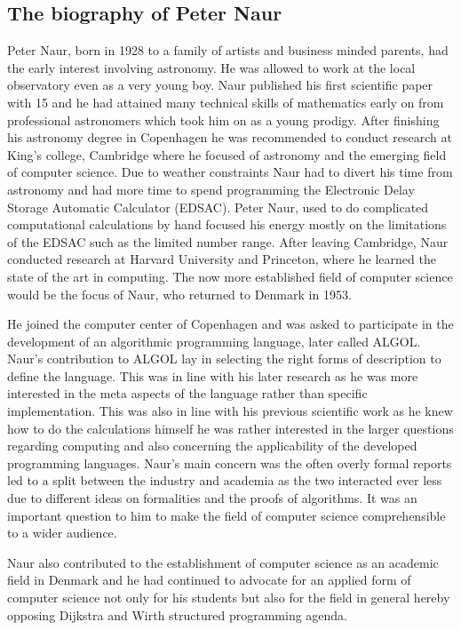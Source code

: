 \documentclass{article}
\begin{document}
\subsection{The biography of Peter Naur}
Peter Naur, born in 1928 to a family of artists and business minded parents, had the early interest involving astronomy. He was allowed to work at the local observatory even as a very young boy. Naur published his first scientific paper with 15 and he had attained many technical skills of mathematics early on from professional astronomers which took him on as a young prodigy. After finishing his astronomy degree in Copenhagen he was recommended to conduct research at King's college, Cambridge where he focused of astronomy and the emerging field of computer science. Due to weather constraints Naur had to divert his time from astronomy and had more time to spend programming the Electronic Delay Storage Automatic Calculator (EDSAC). Peter Naur, used to do complicated computational calculations by hand focused his energy mostly on the limitations of the EDSAC such as the limited number range. After leaving Cambridge, Naur conducted research at Harvard University and Princeton, where he learned the state of the art in computing. The now more established field of computer science would be the focus of Naur, who returned to Denmark in 1953.

He joined the computer center of Copenhagen and was asked to participate in the development of an algorithmic programming language, later called ALGOL. Naur's contribution to ALGOL lay in selecting the right forms of description to define the language. This was in line with his later research as he was more interested in the meta aspects of the language rather than specific implementation. This was also in line with his previous scientific work as he knew how to do the calculations himself he was rather interested in the larger questions regarding computing and also concerning the applicability of the  developed programming languages. Naur's main concern was the often overly formal reports led to a split between the industry and academia as the two interacted ever less due to different ideas on formalities and the proofs of algorithms. It was an important question to him to make the field of computer science comprehensible to a wider audience.

Naur also contributed to the establishment of computer science as an academic field in Denmark and he had continued to advocate for an applied form of computer science not only for his students but also for the field in general hereby opposing Dijkstra and Wirth structured programming agenda.
\end{document}
